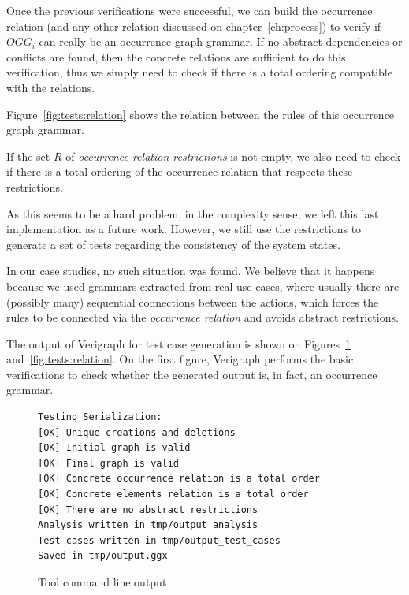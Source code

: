 Once the previous verifications were successful, we can build the occurrence relation (and any other relation discussed on chapter~\ref{ch:process}) to verify if $OGG_i$ can really be an occurrence graph grammar. If no abstract dependencies or conflicts are found, then the concrete relations are sufficient to do this verification, thus we simply need to check if there is a total ordering compatible with the relations.

\begin{example} Figure~\ref{fig:tests:relation} shows the relation between the rules of this occurrence graph grammar.
\end{example}

If the set $R$ of \emph{occurrence relation restrictions} is not empty, we also need to check if there is a total ordering of the occurrence relation that respects these restrictions.

As this seems to be a hard problem, in the complexity sense, we left this last implementation as a future work. However, we still use the restrictions to generate a set of tests regarding the consistency of the system states.

In our case studies, no such situation was found. We believe that it happens because we used grammars extracted from real use cases, where usually there are (possibly many) sequential connections between the actions, which forces the rules to be connected via the \emph{occurrence relation} and avoids abstract restrictions.

The output of Verigraph for test case generation is shown on Figures~\ref{fig:tests:checklist} and~\ref{fig:tests:relation}. On the first figure, Verigraph performs the basic verifications to check whether the generated output is, in fact, an occurrence grammar.

\begin{figure}[!ht]
\caption{Tool command line output}
\begin{verbatim}
Testing Serialization:
[OK] Unique creations and deletions
[OK] Initial graph is valid
[OK] Final graph is valid
[OK] Concrete occurrence relation is a total order
[OK] Concrete elements relation is a total order
[OK] There are no abstract restrictions
Analysis written in tmp/output_analysis
Test cases written in tmp/output_test_cases
Saved in tmp/output.ggx
\end{verbatim}
  \label{fig:tests:checklist}
\end{figure}

